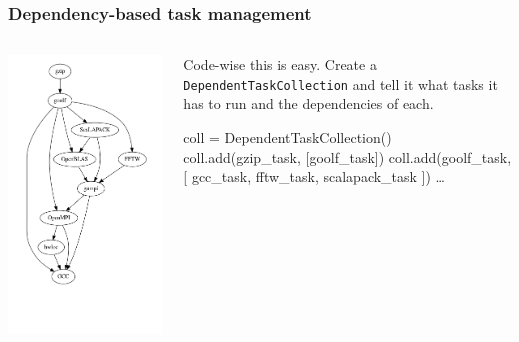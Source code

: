 \documentclass[english,serif,mathserif,xcolor=pdftex,dvipsnames,table]{beamer}
\begin{document}
\begin{frame}[fragile]
  \frametitle{Dependency-based task management}
  \begin{columns}
    \begin{column}{0.4\linewidth}
      \includegraphics[height=1.00\textheight]{fig/gzip1.png}
    \end{column}
    \begin{column}{0.6\linewidth}
      \begin{flushleft}
        Code-wise this is easy.  Create a
        \texttt{DependentTaskCollection} and tell it what tasks it has
        to run and the dependencies of each.
        \\ \+
\begin{semiverbatim}\small
coll = DependentTaskCollection()
coll.add(gzip_task, [goolf_task])
coll.add(goolf_task, [
  gcc_task,
  fftw_task,
  scalapack_task
])
\ldots
\end{semiverbatim}
      \end{flushleft}
    \end{column}
  \end{columns}
\end{frame}
\end{document}
